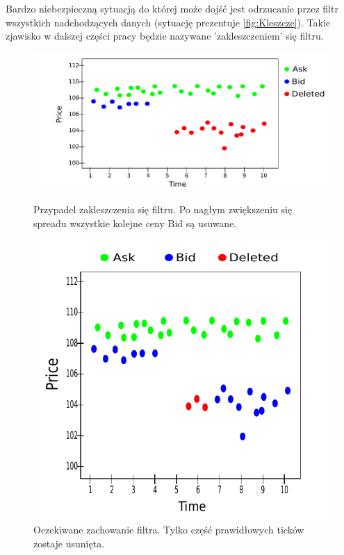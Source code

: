 \documentclass[a4paper,12pt,openany, DIV=calc]{scrbook}
\begin{document}
Bardzo niebezpieczną sytuacją do której może dojść jest odrzucanie przez filtr wszystkich nadchodzących danych (sytuację prezentuje \ref{fig:Kleszcze}). Takie zjawisko w dalszej części pracy będzie nazywane 'zakleszczeniem' się filtru.

\begin{figure}[H]
\centering
\begin{minipage}[t]{.47\textwidth}
  \centering
  \includegraphics[width=\textwidth]{wykresy/kleszcze.pdf}
  \caption{Przypadel zakleszczenia się filtru. Po nagłym zwiększeniu się spreadu wszystkie kolejne ceny Bid są usuwane.}
  \label{fig:Kleszcze}
\end{minipage}%
\mbox{\hspace{0.1cm}} %
\begin{minipage}[t]{.47\textwidth}
  \centering
  \includegraphics[width=\textwidth]{wykresy/kleszczeOK.pdf}
  \caption{Oczekiwane zachowanie filtra. Tylko część prawidłowych ticków zostaje usunięta.}
  \label{fig:KleszczeOK}
\end{minipage}

\end{figure}
\end{document}
